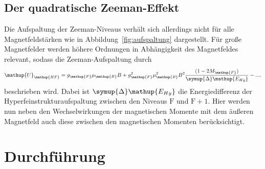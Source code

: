 \documentclass[
  bibliography=totoc,     %
  captions=tableheading,  %
  titlepage=firstiscover, %
]{scrartcl}
\begin{document}
\subsection{Der quadratische Zeeman-Effekt}

Die Aufspaltung der Zeeman-Niveaus verhält sich allerdings nicht für alle Magnetfeldstärken
wie in Abbildung~\ref{fig:aufspaltung} dargestellt. Für große Magnetfelder werden höhere
Ordnungen in Abhängigkeit des Magnetfeldes relevant, sodass die Zeeman-Aufspaltung durch
%
\begin{equation}
  \mathup{U}_{\mathup{HF}} = g_{\mathup{F}}\mu_{\mathup{B}}B + g_{\mathup{F}}^2\mu_{\mathup{B}}^2B^2\frac{(1-2M_{\mathup{F}})}{\symup{\Delta} \mathup{E_{Hy}}} - ....
  \label{eq:quad_zeeman}
\end{equation}
%
beschrieben wird. Dabei ist $\symup{\Delta} \mathup{E_{Hy}}$ die Energiedifferenz der
Hyperfeinstrukturaufspaltung zwischen den Niveaus $\mathup{F}$ und $\mathup{F}+1$.
Hier werden nun neben den Wechselwirkungen der magnetischen Momente mit dem äußeren
Magnetfeld auch diese zwischen den magnetischen Momenten berücksichtigt.

\section{Durchführung}
\label{sec:durchführung}
\end{document}
